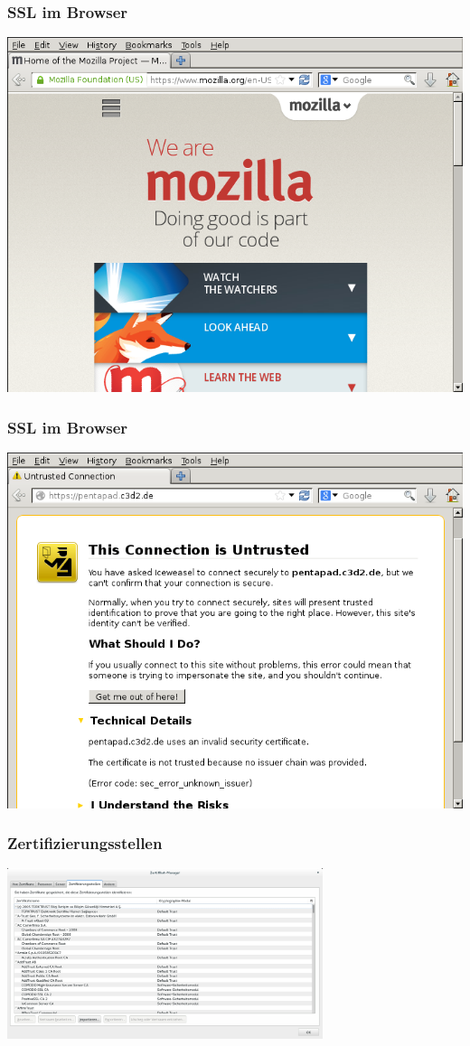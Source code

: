 \documentclass[12pt]{beamer}
\begin{document}
\begin{frame}
    \frametitle{SSL im Browser}
    \includegraphics[height=0.7\textheight]{img/ssl_special.png}
\end{frame}

\begin{frame}
    \frametitle{SSL im Browser}
    \includegraphics[height=0.7\textheight]{img/ssl_unverified.png}
\end{frame}

\begin{frame}
    \frametitle{Zertifizierungsstellen}
    \begin{center}
      \includegraphics[height=5cm]{img/zertifikate.png}
    \end{center}
\end{frame}
\end{document}
